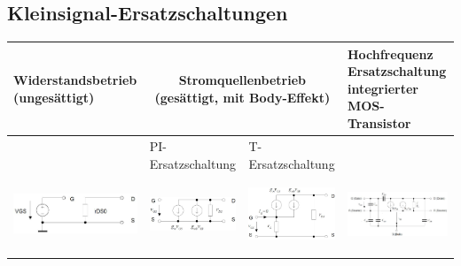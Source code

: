 \subsection{Kleinsignal-Ersatzschaltungen }
\begin{tabular}{|p{}|p{}|p{}|p{}|}
	\hline
	Widerstandsbetrieb (ungesättigt)&\multicolumn{2}{c|}{Stromquellenbetrieb (gesättigt, mit Body-Effekt)}&Hochfrequenz Ersatzschaltung integrierter MOS-Transistor\\ \hline
	& PI-Ersatzschaltung&T-Ersatzschaltung&\\
	\includegraphics[height=1.5cm]{chapters/Transistoren/images/Ersatzsch_unges}&
	\includegraphics[height=1.6cm]{chapters/Transistoren/images/KS_ges_PI_Bulk}&
	\includegraphics[height=2.2cm]{chapters/Transistoren/images/KS_ges_T_Bulk}&
	\includegraphics[height=2.2cm]{chapters/Transistoren/images/KS_HF}\\ \hline
\end{tabular}

